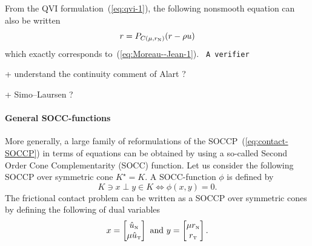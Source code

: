 \begin{remark}
  From the QVI formulation~(\ref{eq:qvi-1}), the following nonsmooth
  equation can also be written
  \begin{equation}
    \label{eq:qvi-proj}
    r = P_{C(\mu,r_\n)}(r-\rho u)
  \end{equation}
  which exactly corresponds to~(\ref{eq:Moreau--Jean-1}). \texttt{ A verifier}
\end{remark}




\begin{ndrva}
  + understand the continuity comment of Alart ?
  
  + Simo--Laursen ?
\end{ndrva}



\paragraph{General SOCC-functions}

More generally, a large family of reformulations of the SOCCP~(\ref{eq:contact-SOCCP}) in terms of equations can be obtained by using a so-called Second Order Cone Complementarity (SOCC) function. Let us consider the following SOCCP over symmetric cone $K^\star = K $. A SOCC-function $\phi$ is defined by
\begin{equation}
  \label{eq:SOCC-function}
  K \ni x \perp y \in K \Longleftrightarrow \phi(x,y)=0.
\end{equation}
The frictional contact problem can be written as a SOCCP over symmetric cones by defining the following of dual variables
\begin{equation}
  \label{eq:SOCC-function1}
  x =
  \begin{bmatrix}
    \hat u_\n \\
    \mu \hat u_{\t}
  \end{bmatrix}
  \text{ and }  y =
  \begin{bmatrix}
    \mu r_\n \\
    r_\t
  \end{bmatrix}.
\end{equation}

